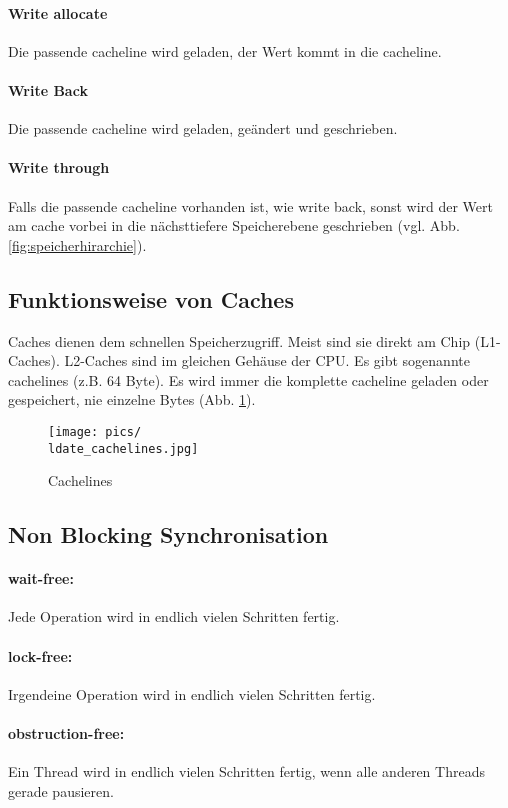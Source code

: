 \paragraph{Write allocate} Die passende cacheline wird geladen, der Wert kommt in die cacheline.
\paragraph{Write Back} Die passende cacheline wird geladen, geändert und geschrieben.
\paragraph{Write through} Falls die passende cacheline vorhanden ist, wie write back, sonst wird der Wert am cache vorbei in die nächsttiefere Speicherebene geschrieben (vgl. Abb. \ref{fig:speicherhirarchie}).

\subsection{Funktionsweise von Caches}
Caches dienen dem schnellen Speicherzugriff. Meist sind sie direkt am Chip (L1-Caches). L2-Caches sind im gleichen Gehäuse der CPU. Es gibt sogenannte cachelines (z.B. 64 Byte). Es wird immer die komplette cacheline geladen oder gespeichert, nie einzelne Bytes (Abb. \ref{fig:cachlines}).  

\begin{figure}[htbp]
\texttt{[image: pics/\\ldate\_cachelines.jpg]}
\caption{Cachelines}
\label{fig:cachlines}
\end{figure}

\subsection{Non Blocking Synchronisation}
\paragraph{wait-free:} Jede Operation wird in endlich vielen Schritten fertig. 
\paragraph{lock-free:} Irgendeine Operation wird in endlich vielen Schritten fertig. 
\paragraph{obstruction-free:} Ein Thread wird in endlich vielen Schritten fertig, wenn alle anderen Threads gerade pausieren. 

